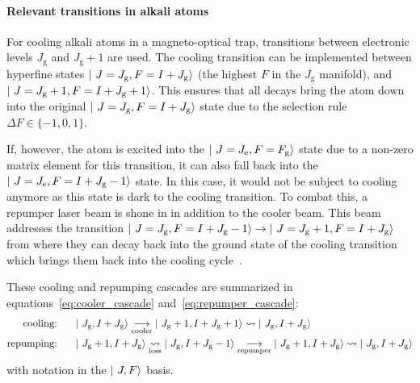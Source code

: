 \paragraph{Relevant transitions in alkali atoms}
\sloppy For cooling alkali atoms in a magneto-optical trap, transitions between electronic levels $J_\text{g}$ and $J_\text{g} + 1$ are used. The cooling transition can be imple\-mented between hyperfine states $\Ket{~J = J_\text{g}, F = I + J_\text{g}}$ (the highest $F$ in the $J_\text{g}$ manifold), and $\Ket{~J = J_\text{g} + 1, F= I + J_\text{g} + 1}$. This ensures that all decays bring the atom down into the original $\Ket{~J = J_\text{g}, F = I + J_\text{g}}$ state due to the selection rule $\Delta F \in \{-1, 0, 1\}$.

If, however, the atom is excited into the $\Ket{~J = J_\text{e}, F = F_\text{g}}$ state due to a non-zero matrix element for this transition, it can also fall back into the $\Ket{~J = J_\text{e}, F = I + J_\text{g} - 1}$ state. In this case, it would not be subject to cooling anymore as this state is dark to the cooling transition. To combat this, a repumper laser beam is shone in in addition to the cooler beam. This beam addresses the transition $\Ket{~J = J_\text{g}, F = I + J_\text{g} - 1} \rightarrow \Ket{~J = J_\text{g} + 1, F = I + J_\text{g}}$ from where they can decay back into the ground state of the cooling transition which brings them back into the cooling cycle~\cite{metcalf_laser_1999}.

These cooling and repumping cascades are summarized in equations~\eqref{eq:cooler_cascade} and~\eqref{eq:repumper_cascade}:
\begin{align}
    \label{eq:cooler_cascade}\text{cooling:}~~~~~ & \Ket{~J_\text{g},I + J_\text{g}} \underset{\text{cooler}}{\longrightarrow} \Ket{~J_\text{g} + 1, I + J_\text{g} + 1} \rightsquigarrow  \Ket{~J_\text{g}, I + J_\text{g}}\\
    \label{eq:repumper_cascade}\text{repumping:}~~~~~ & \Ket{~J_\text{g} + 1, I + J_\text{g}} \underset{\text{loss}}{\rightsquigarrow} \Ket{~J_\text{g}, I + J_\text{g} - 1}  \underset{\text{repumper}}{\longrightarrow} \Ket{~J_\text{g} + 1, I + J_\text{g}} \rightsquigarrow  \Ket{~J_\text{g}, I + J_\text{g}}
\end{align}
with notation in the $\Ket{~J, F}$ basis.

